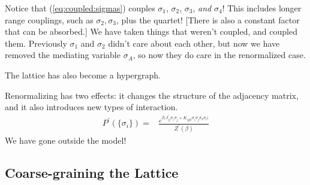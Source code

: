 \documentclass[]{article}
\begin{document}
Notice that (\ref{eq:coupled:sigmas}) couples $\sigma_1$, $\sigma_2$, $\sigma_3$, \emph{and} $\sigma_4$! This includes longer range couplings, such as $\sigma_2, \sigma_3$, plus the quartet! [There is also a constant factor that can be absorbed.] We have taken things that weren't coupled, and coupled them. Previously $\sigma_1$ and $\sigma_2$ didn't care about each other, but now we have removed the mediating variable $\sigma_A$, so now they do care in the renormalized case.

The lattice has also become a hypergraph.

Renormalizing has two effects: it changes the structure of the adjacency matrix, and it also introduces new types of interaction.
\begin{align*}
	P^\prime(\{\sigma_i\}) =& \frac{e^{\beta\big(J^\prime_{ij}\sigma_i\sigma_j+K_{ijkl}\sigma_i\sigma_j\sigma_k\sigma_l\big)}}{Z^\prime(\beta)}
\end{align*}
We have gone outside the model!

\subsection{Coarse-graining the Lattice}
\end{document}
